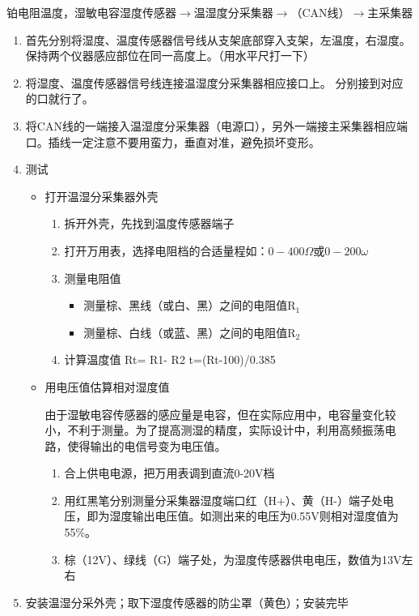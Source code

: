 ﻿\documentclass[UTF8,11pt]{ctexbook}%
\begin{document}
	铂电阻温度，湿敏电容湿度传感器\(\to\)温湿度分采集器\(\to\)（CAN线）\(\to\)主采集器
\begin{enumerate}
	\item 首先分别将湿度、温度传感器信号线从支架底部穿入支架，左温度，右湿度。保持两个仪器感应部位在同一高度上。（用水平尺打一下）
	\item 将湿度、温度传感器信号线连接温湿度分采集器相应接口上。 分别接到对应的口就行了。
	\item 将CAN线的一端接入温湿度分采集器（电源口），另外一端接主采集器相应端口。插线一定注意不要用蛮力，垂直对准，避免损坏变形。
	\item 测试
	\begin{itemize}
		\item 打开温湿分采集器外壳
		\begin{enumerate}
			\item 拆开外壳，先找到温度传感器端子
			\item 打开万用表，选择电阻档的合适量程如：\(0-400\Omega\)或\(0-200\omega\) 
			\item 测量电阻值
			\begin{itemize}
				\item 测量棕、黑线（或白、黑）之间的电阻值\(\mathrm{R}_1\)
				\item 测量棕、白线（或蓝、黑）之间的电阻值\(\mathrm{R}_2\) 
			\end{itemize}
			\item 计算温度值 Rt= R1- R2  t=(Rt-100)/0.385
		\end{enumerate}
		\item 用电压值估算相对湿度值\par\qquad
		由于湿敏电容传感器的感应量是电容，但在实际应用中，电容量变化较小，不利于测量。为了提高测湿的精度，实际设计中，利用高频振荡电路，使得输出的电信号变为电压值。
		\begin{enumerate}
			\item 合上供电电源，把万用表调到直流0-20V档
			\item 用红黑笔分别测量分采集器湿度端口红（H+）、黄（H-）端子处电压，即为湿度输出电压值。如测出来的电压为0.55V则相对湿度值为55\%。
			\item 棕（12V）、绿线（G）端子处，为湿度传感器供电电压，数值为13V左右 
		\end{enumerate}
	\end{itemize}
	\item 安装温湿分采外壳；取下湿度传感器的防尘罩（黄色）；安装完毕
\end{enumerate}
\end{document}
